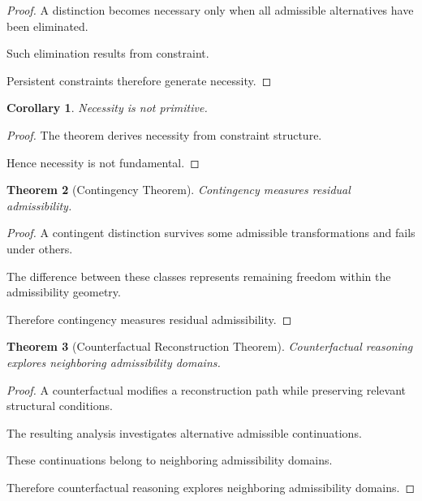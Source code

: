 \documentclass[12pt,oneside]{article}
\newtheorem{theorem}{Theorem}[section] \newtheorem{lemma}[theorem]{Lemma} \newtheorem{proposition}[theorem]{Proposition} \newtheorem{corollary}[theorem]{Corollary}
\theoremstyle{definition}
\begin{document}
\begin{proof}

A distinction becomes necessary only when all admissible alternatives have been eliminated.

Such elimination results from constraint.

Persistent constraints therefore generate necessity.

\end{proof}

\begin{corollary}

Necessity is not primitive.

\end{corollary}

\begin{proof}

The theorem derives necessity from constraint structure.

Hence necessity is not fundamental.

\end{proof}

\begin{theorem}[Contingency Theorem]

Contingency measures residual admissibility.

\end{theorem}

\begin{proof}

A contingent distinction survives some admissible transformations and fails under others.

The difference between these classes represents remaining freedom within the admissibility geometry.

Therefore contingency measures residual admissibility.

\end{proof}

\begin{theorem}[Counterfactual Reconstruction Theorem]

Counterfactual reasoning explores neighboring admissibility domains.

\end{theorem}

\begin{proof}

A counterfactual modifies a reconstruction path while preserving relevant structural conditions.

The resulting analysis investigates alternative admissible continuations.

These continuations belong to neighboring admissibility domains.

Therefore counterfactual reasoning explores neighboring admissibility domains.

\end{proof}
\end{document}

